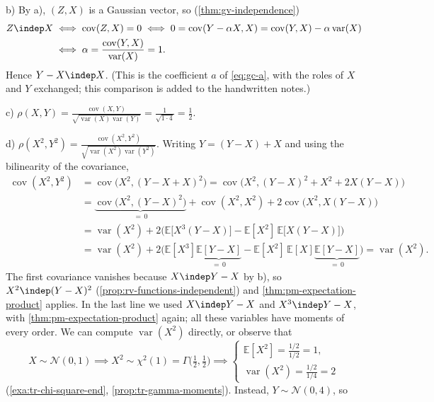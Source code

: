 \begin{example}
b) By a), $(Z,X)$ is a Gaussian vector, so (\cref{thm:gv-independence})
\[
\begin{aligned}
  Z\indep X&\iff\operatorname{cov}(Z,X)=0\iff0=\operatorname{cov}(Y-\alpha X,X)=\operatorname{cov}(Y,X)-\alpha\operatorname{var}(X)\\
  &\iff\alpha=\frac{\operatorname{cov}(Y,X)}{\operatorname{var}(X)}=1 .
\end{aligned}
\]
Hence $Y-X\indep X$. (This is the coefficient $a$ of \eqref{eq:gc-a}, with the roles of $X$ and $Y$
exchanged; this comparison is added to the handwritten notes.)

c) $\displaystyle\rho(X,Y)=\frac{\operatorname{cov}(X,Y)}{\sqrt{\operatorname{var}(X)\operatorname{var}(Y)}}
=\frac1{\sqrt{1\cdot4}}=\frac12$.

d) $\displaystyle\rho(X^2,Y^2)=\frac{\operatorname{cov}(X^2,Y^2)}{\sqrt{\operatorname{var}(X^2)\operatorname{var}(Y^2)}}$.
Writing $Y=(Y-X)+X$ and using the bilinearity of the covariance,
\[
\begin{aligned}
  \operatorname{cov}(X^2,Y^2)&=\operatorname{cov}\big(X^2,(Y-X+X)^2\big)
  =\operatorname{cov}\big(X^2,(Y-X)^2+X^2+2X(Y-X)\big)\\
  &=\underbrace{\operatorname{cov}\big(X^2,(Y-X)^2\big)}_{=\,0}+\operatorname{cov}(X^2,X^2)+2\operatorname{cov}\big(X^2,X(Y-X)\big)\\
  &=\operatorname{var}(X^2)+2\Big(\mathbb E\big[X^3(Y-X)\big]-\mathbb E[X^2]\,\mathbb E\big[X(Y-X)\big]\Big)\\
  &=\operatorname{var}(X^2)+2\Big(\mathbb E[X^3]\underbrace{\mathbb E[Y-X]}_{=\,0}-\mathbb E[X^2]\,\mathbb E[X]\underbrace{\mathbb E[Y-X]}_{=\,0}\Big)
  =\operatorname{var}(X^2).
\end{aligned}
\]
The first covariance vanishes because $X\indep Y-X$ by b), so $X^2\indep(Y-X)^2$
(\cref{prop:rv-functions-independent}) and \cref{thm:pm-expectation-product} applies. In the last line
we used $X\indep Y-X$ and $X^3\indep Y-X$, with \cref{thm:pm-expectation-product} again; all these
variables have moments of every order. We can compute $\operatorname{var}(X^2)$ directly, or observe
that
\[
  X\sim\mathcal N(0,1)\implies X^2\sim\chi^2(1)=\Gamma\big(\tfrac12,\tfrac12\big)
  \implies
  \begin{cases}
    \mathbb E[X^2]=\frac{1/2}{1/2}=1,\\[0.5ex]
    \operatorname{var}(X^2)=\frac{1/2}{1/4}=2
  \end{cases}
\]
(\cref{exa:tr-chi-square-end}, \cref{prop:tr-gamma-moments}). Instead, $Y\sim\mathcal N(0,4)$, so

\end{example}
